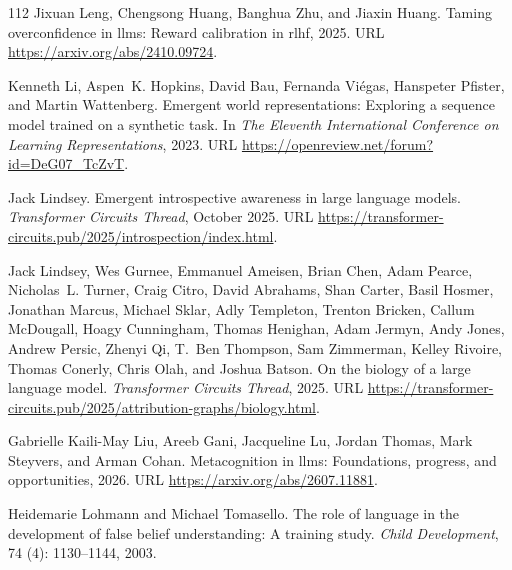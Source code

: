 \begin{thebibliography}{112}
Jixuan Leng, Chengsong Huang, Banghua Zhu, and Jiaxin Huang.
\newblock Taming overconfidence in llms: Reward calibration in rlhf, 2025.
\newblock URL \url{https://arxiv.org/abs/2410.09724}.

Kenneth Li, Aspen~K. Hopkins, David Bau, Fernanda Vi{\'e}gas, Hanspeter Pfister, and Martin Wattenberg.
\newblock Emergent world representations: Exploring a sequence model trained on a synthetic task.
\newblock In \emph{The Eleventh International Conference on Learning Representations}, 2023.
\newblock URL \url{https://openreview.net/forum?id=DeG07_TcZvT}.

Jack Lindsey.
\newblock Emergent introspective awareness in large language models.
\newblock \emph{Transformer Circuits Thread}, October 2025.
\newblock URL \url{https://transformer-circuits.pub/2025/introspection/index.html}.

Jack Lindsey, Wes Gurnee, Emmanuel Ameisen, Brian Chen, Adam Pearce, Nicholas~L. Turner, Craig Citro, David Abrahams, Shan Carter, Basil Hosmer, Jonathan Marcus, Michael Sklar, Adly Templeton, Trenton Bricken, Callum McDougall, Hoagy Cunningham, Thomas Henighan, Adam Jermyn, Andy Jones, Andrew Persic, Zhenyi Qi, T.~Ben Thompson, Sam Zimmerman, Kelley Rivoire, Thomas Conerly, Chris Olah, and Joshua Batson.
\newblock On the biology of a large language model.
\newblock \emph{Transformer Circuits Thread}, 2025.
\newblock URL \url{https://transformer-circuits.pub/2025/attribution-graphs/biology.html}.

Gabrielle Kaili-May Liu, Areeb Gani, Jacqueline Lu, Jordan Thomas, Mark Steyvers, and Arman Cohan.
\newblock Metacognition in llms: Foundations, progress, and opportunities, 2026.
\newblock URL \url{https://arxiv.org/abs/2607.11881}.

Heidemarie Lohmann and Michael Tomasello.
\newblock The role of language in the development of false belief understanding: A training study.
\newblock \emph{Child Development}, 74 (4): 1130--1144, 2003.


\end{thebibliography}
